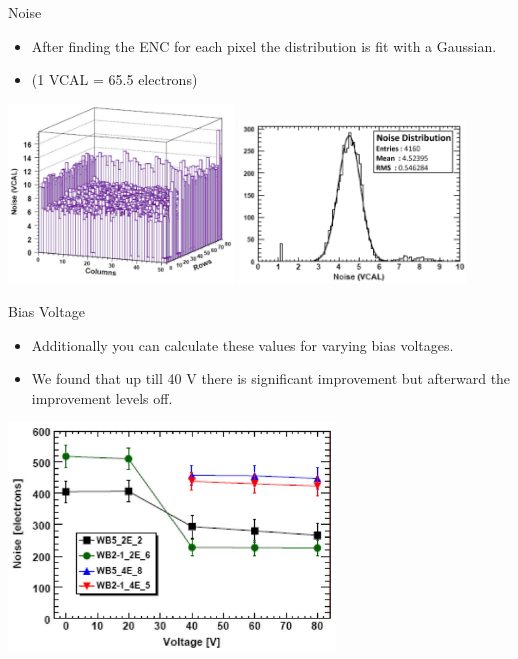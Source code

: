 \documentclass{beamer}
\begin{document}
\begin{frame}{Noise}
  \begin{center}
    \begin{itemize}
    \item
      After finding the ENC for each pixel the distribution is fit with a Gaussian.
    \item
      (1 VCAL = 65.5 electrons)
    \end{itemize}
\includegraphics[width=0.45\textwidth]{images/map.pdf}
\includegraphics[width=0.45\textwidth]{images/noise.pdf}

  \end{center}
\end{frame}

\begin{frame}{Bias Voltage}
  \begin{center}
    \begin{itemize}
    \item
      Additionally you can calculate these values for varying bias voltages.
    \item
      We found that up till 40 V there is significant improvement but afterward the improvement levels off.
    \end{itemize}
\includegraphics[width=0.65\textwidth]{images/bias.pdf}

  \end{center}
\end{frame}
\end{document}
